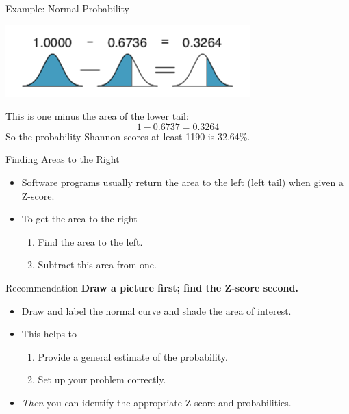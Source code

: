 \begin{frame}{Example: Normal Probability}
    \begin{center}
        \includegraphics[scale=0.65]{images/normalcomp.png}
    \end{center}
    This is one minus the area of the lower tail:
    \[
        1-0.6737=0.3264
    \]
    So the probability Shannon scores at least 1190 is 32.64\%.
\end{frame}

\begin{frame}{Finding Areas to the Right}
    \begin{itemize}
        \item Software programs usually return the area to the left (left tail) when given a Z-score.
        \item To get the area to the right
        \begin{enumerate}
            \item Find the area to the left.
            \item Subtract this area from one.
        \end{enumerate}
    \end{itemize}
\end{frame}

\begin{frame}{Recommendation}
    \textbf{Draw a picture first; find the Z-score second.}
    \begin{itemize}
        \item Draw and label the normal curve and shade the area of interest.
        \item This helps to 
        \begin{enumerate}
            \item Provide a general estimate of the probability.
            \item Set up your problem correctly.
        \end{enumerate}
        \item \textit{Then} you can identify the appropriate Z-score and probabilities.
    \end{itemize}
\end{frame}

